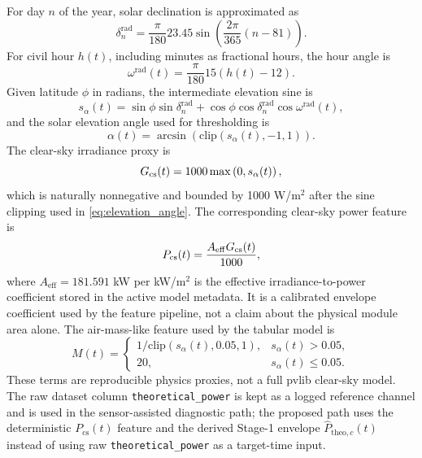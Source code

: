 For day $n$ of the year, solar declination is approximated as
\begin{equation}
\delta_n^{\mathrm{rad}} =
\frac{\pi}{180}23.45
\sin\left(\frac{2\pi}{365}(n-81)\right).
\label{eq:declination}
\end{equation}
For civil hour $h(t)$, including minutes as fractional hours, the hour angle is
\begin{equation}
\omega^{\mathrm{rad}}(t)=\frac{\pi}{180}15\left(h(t)-12\right).
\label{eq:hour_angle}
\end{equation}
Given latitude $\phi$ in radians, the intermediate elevation sine is
\begin{equation}
s_{\alpha}(t)=
\sin\phi\sin\delta_n^{\mathrm{rad}}
+\cos\phi\cos\delta_n^{\mathrm{rad}}\cos\omega^{\mathrm{rad}}(t),
\label{eq:elevation}
\end{equation}
and the solar elevation angle used for thresholding is
\begin{equation}
\alpha(t)=\arcsin\left(\mathrm{clip}\left(s_{\alpha}(t),-1,1\right)\right).
\label{eq:elevation_angle}
\end{equation}
The clear-sky irradiance proxy is
\begin{equation}
G_{\mathrm{cs}}(t)=1000\max\left(0,s_{\alpha}(t)\right),
\label{eq:gcs}
\end{equation}
which is naturally nonnegative and bounded by 1000 W/m$^2$ after the sine clipping used in \eqref{eq:elevation_angle}. The corresponding clear-sky power feature is
\begin{equation}
P_{\mathrm{cs}}(t)=\frac{A_{\mathrm{eff}}G_{\mathrm{cs}}(t)}{1000},
\label{eq:pcs}
\end{equation}
where $A_{\mathrm{eff}}=181.591$ kW per kW/m$^2$ is the effective irradiance-to-power coefficient stored in the active model metadata. It is a calibrated envelope coefficient used by the feature pipeline, not a claim about the physical module area alone. The air-mass-like feature used by the tabular model is
\begin{equation}
M(t)=
\begin{cases}
1/\mathrm{clip}\left(s_{\alpha}(t),0.05,1\right), & s_{\alpha}(t)>0.05,\\
20, & s_{\alpha}(t)\leq0.05.
\end{cases}
\label{eq:airmass}
\end{equation}
These terms are reproducible physics proxies, not a full pvlib clear-sky model. The raw dataset column \texttt{theoretical\_power} is kept as a logged reference channel and is used in the sensor-assisted diagnostic path; the proposed path uses the deterministic $P_{\mathrm{cs}}(t)$ feature and the derived Stage-1 envelope $\widehat{P}_{\mathrm{theo},c}(t)$ instead of using raw \texttt{theoretical\_power} as a target-time input.

